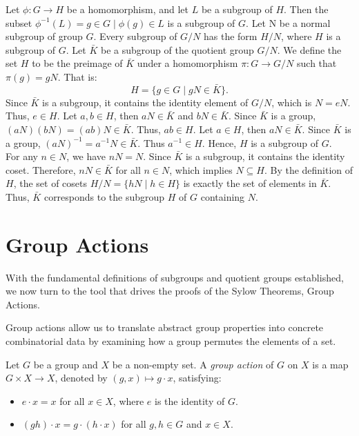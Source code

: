 \documentclass[a4paper,12pt]{article}
\begin{document}
{
    Let $\phi: G \to H$ be a homomorphism, and let $L$ be a subgroup of $H$. Then the subset $\phi^{-1}(L)={g \in G \mid \phi(g) \in L}$ is a subgroup of $G$.
}
{
    Let N be a normal subgroup of group $G$. Every subgroup of $G/N$ has the form $H/N$, where $H$ is a subgroup of $G.$
}
{
    Let $\bar{K}$ be a subgroup of the quotient group $G/N$. We define the set $H$ to be the preimage of $\bar{K}$ under a homomorphism $\pi: G \to G/N$ such that $\pi(g) = gN$. That is:
\[ H = \{ g \in G \mid gN \in \bar{K} \}. \]
Since $\bar{K}$ is a subgroup, it contains the identity element of $G/N$, which is $N = eN$. Thus, $e \in H$.
Let $a, b \in H$, then $aN \in \bar{K}$ and $bN \in \bar{K}$. Since $\bar{K}$ is a group, $(aN)(bN) = (ab)N \in \bar{K}$. Thus, $ab \in H$.
Let $a \in H$, then $aN \in \bar{K}$. Since $\bar{K}$ is a group, $(aN)^{-1} = a^{-1}N \in \bar{K}$. Thus $a^{-1} \in H.$
Hence, $H$ is a subgroup of $G.$
\\For any $n \in N$, we have $nN = N$. Since $\bar{K}$ is a subgroup, it contains the identity coset. Therefore, $nN \in \bar{K}$ for all $n \in N$, which implies $N \subseteq H$.
By the definition of $H$, the set of cosets $H/N = \{ hN \mid h \in H \}$ is exactly the set of elements in $\bar{K}$.
Thus, $\bar{K}$ corresponds to the subgroup $H$ of $G$ containing $N$.
}

\section{Group Actions}
With the fundamental definitions of subgroups and quotient groups established, we now turn to the tool that drives the proofs of the Sylow Theorems, Group Actions.

Group actions allow us to translate abstract group properties into concrete combinatorial data by examining how a group permutes the elements of a set.

{
    Let $G$ be a group and $X$ be a non-empty set. A \textit{group action} of $G$ on $X$ is a map $G \times X \to X$, denoted by $(g,x) \mapsto g \cdot x$, satisfying:
    \begin{itemize}
        \item $e \cdot x = x$ for all $x \in X$, where $e$ is the identity of $G$.
        \item $(gh) \cdot x = g \cdot (h \cdot x)$ for all $g,h \in G$ and $x \in X$.
    \end{itemize}
}
\end{document}
